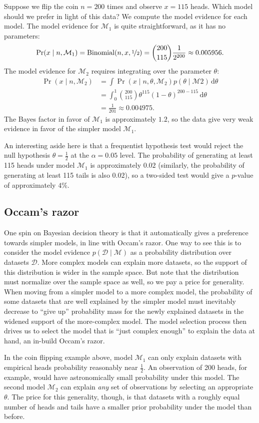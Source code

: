 \documentclass{article}
\newcommand{\given}{\mid}
\newcommand{\mc}[1]{\mathcal{#1}}
\newcommand{\data}{\mc{D}}
\newcommand{\model}{\mc{M}}
\newcommand{\intd}[1]{\,\mathrm{d}{#1}}
\begin{document}
Suppose we flip the coin $n = 200$ times and observe $x = 115$ heads.
Which model should we prefer in light of this data?  We compute the
model evidence for each model.  The model evidence for $\model_1$ is
quite straightforward, as it has no parameters:
\begin{equation*}
  \Pr(x \given n, \model_1)
  =
  \mathrm{Binomial}(n, x, \nicefrac{1}{2})
  =
  \binom{200}{115}
  \frac{1}{2^{200}}
  \approx
  0.005956.
\end{equation*}
The model evidence for $\model_2$ requires integrating over the
parameter $\theta$:
\begin{align*}
  \Pr(x \given n, \model_2)
  &=
  \int
  \Pr(x \given n, \theta, \model_2)
  p(\theta \given \model2)
  \intd{\theta}
  \\
  &=
  \int_{0}^{1}
  \binom{200}{115}
  \theta^{115}
  (1 - \theta)^{200 - 115}
  \intd{\theta}
  \\
  &=
  \frac{1}{201}
  \approx
  0.004975.
\end{align*}
The Bayes factor in favor of $\model_1$ is approximately $1.2$, so the
data give very weak evidence in favor of the simpler model $\model_1$.

An interesting aside here is that a frequentist hypothesis test would
reject the null hypothesis $\theta = \frac{1}{2}$ at the $\alpha =
0.05$ level. The probability of generating at least 115 heads under
model $\model_1$ is approximately $0.02$ (similarly, the probability
of generating at least 115 tails is also $0.02$), so a two-sided test
would give a $p$-value of approximately $4\%$.

\subsection*{Occam's razor}

One spin on Bayesian decision theory is that it automatically gives a
preference towards simpler models, in line with Occam's razor.  One
way to see this is to consider the model evidence $p(\data \given
\model)$ as a probability distribution over datasets $\data$.  More
complex models can explain more datasets, so the support of this
distribution is wider in the sample space.  But note that the
distribution must normalize over the sample space as well, so we pay a
price for generality.  When moving from a simpler model to a more
complex model, the probability of some datasets that are well
explained by the simpler model must inevitably decrease to ``give up''
probability mass for the newly explained datasets in the widened
support of the more-complex model.  The model selection process then
drives us to select the model that is ``just complex enough'' to
explain the data at hand, an in-build Occam's razor.

In the coin flipping example above, model $\model_1$ can only explain
datasets with empirical heads probability reasonably near
$\frac{1}{2}$.  An observation of 200 heads, for example, would have
astronomically small probability under this model.  The second model
$\model_2$ can explain \emph{any} set of observations by selecting an
appropriate $\theta$.  The price for this generality, though, is that
datasets with a roughly equal number of heads and tails have a smaller
prior probability under the model than before.
\end{document}

